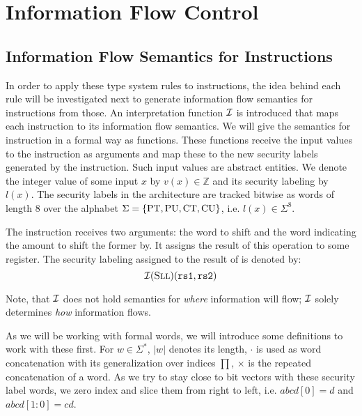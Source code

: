 
\section{Information Flow Control}


\subsection{Information Flow Semantics for Instructions}
\label{sec:ifc-model}


In order to apply these type system rules to instructions, the idea behind each rule will be investigated next to generate information flow semantics for instructions from those.
An interpretation function $ \mathcal{I} $ is introduced that maps each instruction to its information flow semantics.
We will give the semantics for instruction in a formal way as functions.
These functions receive the input values to the instruction as arguments and map these to the new security labels generated by the instruction.
Such input values are abstract entities.
We denote the integer value of some input $ x $ by $ v(x) \in \mathbb{Z} $ and its security labeling by $ l(x) $.
The security labels in the architecture are tracked bitwise as words of length 8 over the alphabet $ \Sigma = \{ \text{PT}, \text{PU}, \text{CT}, \text{CU} \} $, i.e. $ l(x) \in \Sigma^8 $.

\begin{example}
    The  instruction receives two arguments: the word to shift and the word indicating the amount to shift the former by.
    It assigns the result of this operation to some register.
    The security labeling assigned to the result of  is denoted by:
    \begin{equation*}
        \mathcal{I}(\textsc{Sll})(\texttt{rs1}, \texttt{rs2})
    \end{equation*}

    Note, that $ \mathcal{I} $ does not hold semantics for \textit{where} information will flow; $ \mathcal{I} $ solely determines \textit{how} information flows.
\end{example}

As we will be working with formal words, we will introduce some definitions to work with these first.
For $ w  \in \Sigma^* $, $ |w| $ denotes its length,
$ \cdot $ is used as word concatenation with its generalization over indices $ \prod $, $ \times $ is the repeated concatenation of a word.
As we try to stay close to bit vectors with these security label words, we zero index and slice them from right to left, i.e. $ abcd[0] = d $ and $ abcd[1:0] = cd $.

